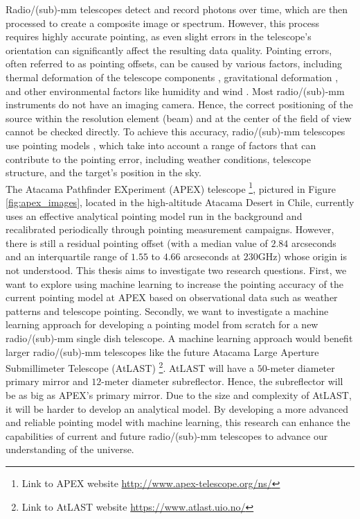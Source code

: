 Radio/(sub)-mm telescopes detect and record photons over time, which are then processed to create a composite image or spectrum.
However, this process requires highly accurate pointing, as even slight errors in the telescope's orientation can significantly affect the resulting data quality.
Pointing errors, often referred to as pointing offsets, can be caused by various factors, including thermal deformation of the telescope components \cite{Dong2018},
gravitational deformation \cite{GravDeformation}, and other environmental factors like humidity \cite{Corstanje2017} and wind \cite{Gawronski2005}.
Most radio/(sub)-mm instruments do not have an imaging camera.
Hence, the correct positioning of the source within the resolution element (beam) and at the center of the field of view cannot be checked directly.
To achieve this accuracy, radio/(sub)-mm telescopes use pointing models \cite{stumpff1972}, which take into account a range of factors that can contribute to the pointing error,
including weather conditions, telescope structure, and the target's position in the sky.\\

The Atacama Pathfinder EXperiment (APEX) telescope \cite{APEX2006}\footnote[1]{Link to APEX website \href{http://www.apex-telescope.org/ns/}{http://www.apex-telescope.org/ns/}}, pictured in Figure \ref{fig:apex_images}, located in the high-altitude Atacama Desert in Chile,
currently uses an effective analytical pointing model run in the background and recalibrated periodically through pointing measurement campaigns.
However, there is still a residual pointing offset (with a median value of $2.84$ arcseconds and an interquartile range of $1.55$ to $4.66$ arcseconds at $230$GHz) whose origin is not understood.
This thesis aims to investigate two research questions.
First, we want to explore using machine learning to increase the pointing accuracy of the current pointing model at APEX based on observational data such as weather patterns and telescope pointing.
Secondly, we want to investigate a machine learning approach for developing a pointing model from scratch for a new radio/(sub)-mm single dish telescope.
A machine learning approach would benefit larger radio/(sub)-mm telescopes like the future Atacama Large Aperture Submillimeter Telescope (AtLAST)
\footnote[2]{Link to AtLAST website \href{https://www.atlast.uio.no/}{https://www.atlast.uio.no/}}.
AtLAST will have a $50$-meter diameter primary mirror and $12$-meter diameter subreflector. Hence, the subreflector will be as big as APEX's primary mirror.
Due to the size and complexity of AtLAST, it will be harder to develop an analytical model.
By developing a more advanced and reliable pointing model with machine learning,
this research can enhance the capabilities of current and future radio/(sub)-mm telescopes to advance our understanding of the universe.


